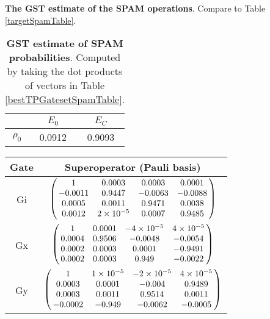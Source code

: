{\begin{table}[h]
\begin{center}
\caption{\textbf{The GST estimate of the SPAM operations}.  Compare to Table \ref{targetSpamTable}.\label{bestTPGatesetSpamTable}}
\end{center}
\end{table}

\begin{table}[h]
\begin{center}
\begin{tabular}[l]{|c|c|c|}
\hline
 & $E_{0}$ & $E_C$ \\ \hline
$\rho_{0}$ & 0.0912 & 0.9093 \\ \hline
\end{tabular}

\caption{\textbf{GST estimate of SPAM probabilities}.  Computed by taking the dot products of vectors in Table \ref{bestTPGatesetSpamTable}.\label{bestTPGatesetSpamParametersTable}}
\end{center}
\end{table}

\begin{table}[h]
\begin{center}
\begin{tabular}[l]{|c|c|}
\hline
Gate & Superoperator (Pauli basis) \\ \hline
Gi & $ \left(\!\!\begin{array}{cccc}
1 & 0.0003 & 0.0003 & 0.0001 \\ 
-0.0011 & 0.9447 & -0.0063 & -0.0088 \\ 
0.0005 & 0.0011 & 0.9471 & 0.0038 \\ 
0.0012 & 2\times 10^{-5} & 0.0007 & 0.9485
 \end{array}\!\!\right) $
 \\ \hline
Gx & $ \left(\!\!\begin{array}{cccc}
1 & 0.0001 & -4\times 10^{-5} & 4\times 10^{-5} \\ 
0.0004 & 0.9506 & -0.0048 & -0.0054 \\ 
0.0002 & 0.0003 & 0.0001 & -0.9491 \\ 
0.0002 & 0.0003 & 0.949 & -0.0022
 \end{array}\!\!\right) $
 \\ \hline
Gy & $ \left(\!\!\begin{array}{cccc}
1 & 1\times 10^{-5} & -2\times 10^{-5} & 4\times 10^{-5} \\ 
0.0003 & 0.0001 & -0.004 & 0.9489 \\ 
0.0003 & 0.0011 & 0.9514 & 0.0011 \\ 
-0.0002 & -0.949 & -0.0062 & -0.0005
 \end{array}\!\!\right) $
 \\ \hline
\end{tabular}


\end{center}
\end{table}}
